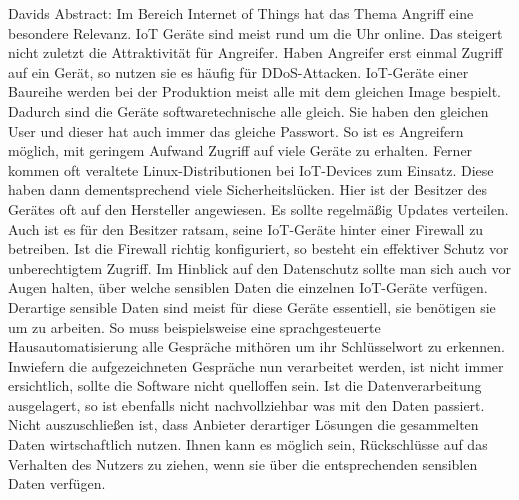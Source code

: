 
Davids Abstract:
Im Bereich Internet of Things hat das Thema Angriff eine besondere Relevanz. IoT Geräte sind meist rund um die Uhr online. Das steigert nicht zuletzt die Attraktivität für Angreifer. Haben Angreifer erst einmal Zugriff auf ein Gerät, so nutzen sie es häufig für DDoS-Attacken. IoT-Geräte einer Baureihe werden bei der Produktion meist alle mit dem gleichen Image bespielt. Dadurch sind die Geräte softwaretechnische alle gleich. Sie haben den gleichen User und dieser hat auch immer das gleiche Passwort. So ist es Angreifern möglich, mit geringem Aufwand Zugriff auf viele Geräte zu erhalten. Ferner kommen oft veraltete Linux-Distributionen bei IoT-Devices zum Einsatz. Diese haben dann dementsprechend viele Sicherheitslücken. Hier ist der Besitzer des Gerätes oft auf den Hersteller angewiesen. Es sollte regelmäßig Updates verteilen. Auch ist es für den Besitzer ratsam, seine IoT-Geräte hinter einer Firewall zu betreiben. Ist die Firewall richtig konfiguriert, so besteht ein effektiver Schutz vor unberechtigtem Zugriff. Im Hinblick auf den Datenschutz sollte man sich auch vor Augen halten, über welche sensiblen Daten die einzelnen IoT-Geräte verfügen. Derartige sensible Daten sind meist für diese Geräte essentiell, sie benötigen sie um zu arbeiten. So muss beispielsweise eine sprachgesteuerte Hausautomatisierung alle Gespräche mithören um ihr Schlüsselwort zu erkennen. Inwiefern die aufgezeichneten Gespräche nun verarbeitet werden, ist nicht immer ersichtlich, sollte die Software nicht quelloffen sein. Ist die Datenverarbeitung ausgelagert, so ist ebenfalls nicht nachvollziehbar was mit den Daten passiert. Nicht auszuschließen ist, dass Anbieter derartiger Lösungen die gesammelten Daten wirtschaftlich nutzen. Ihnen kann es möglich sein, Rückschlüsse auf das Verhalten des Nutzers zu ziehen, wenn sie über die entsprechenden sensiblen Daten verfügen.